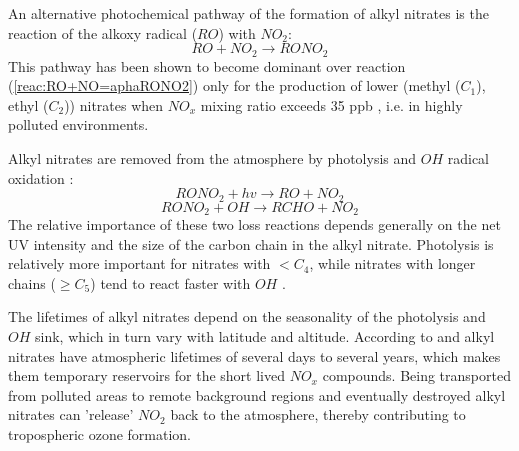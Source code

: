 \documentclass[11pt,a4paper]{article}
\begin{document}
An alternative photochemical pathway of the formation of alkyl nitrates is the reaction of the alkoxy radical ($RO$) with $NO_2$:
\begin{equation}\label{reac:RO+NO2=RONO2}
RO + NO_2 \rightarrow RONO_2
\end{equation}
This pathway has been shown to become dominant over reaction (\ref{reac:RO+NO=aphaRONO2}) only for the production of lower (methyl ($C_1$), ethyl ($C_2$)) nitrates when $NO_x$ mixing ratio exceeds 35 ppb \citep{Archibald2007}, i.e. in highly polluted environments.

Alkyl nitrates are removed from the atmosphere by photolysis \citep{Turberg1990} and $OH$ radical oxidation \citep{Talukdar1997}:
\begin{equation} \label{reac:RONO2+hv=RO+NO2}
RONO_2 + hv \rightarrow RO + NO_2
\end{equation}
\begin{equation} \label{reac:RONO2+OH=RCHO+NO2}
RONO_2 + OH \rightarrow RCHO + NO_2
\end{equation}
The relative importance of these two loss reactions depends generally on the net UV intensity and the size of the carbon chain in the alkyl nitrate. Photolysis is relatively more important for nitrates with $< C_4$, while nitrates with longer chains ($\geq C_5$) tend to react faster with $OH$ \citep{Worton2010}.

The lifetimes of alkyl nitrates depend on the seasonality of the photolysis and $OH$ sink, which in turn vary with latitude and altitude. According to \citep{Clemitshaw1997} and \citep{Turberg1990} alkyl nitrates have atmospheric lifetimes of several days to several years, which makes them temporary reservoirs for the short lived $NO_x$ compounds. Being transported from polluted areas to remote background regions and eventually destroyed alkyl nitrates can 'release' $NO_2$ back to the atmosphere, thereby contributing to tropospheric ozone formation.
\end{document}
